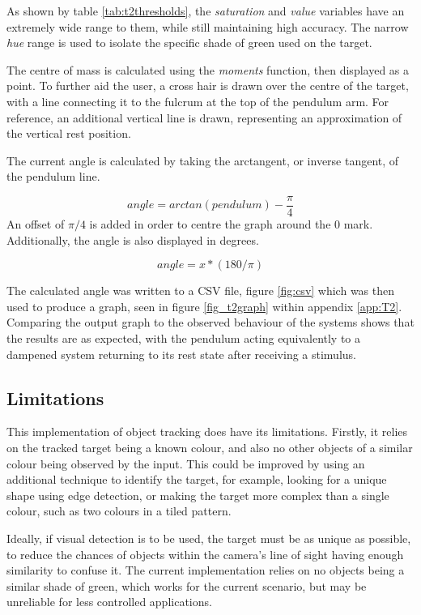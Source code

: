 \documentclass[conference]{IEEEtran}
\begin{document}
As shown by table \ref{tab:t2thresholds}, the \textit{saturation} and \textit{value} variables have an extremely wide range to them, while still maintaining high accuracy. The narrow \textit{hue} range is used to isolate the specific shade of green used on the target.

The centre of mass is calculated using the \textit{moments} function, then displayed as a point. To further aid the user, a cross hair is drawn over the centre of the target, with a line connecting it to the fulcrum at the top of the pendulum arm. For reference, an additional vertical line is drawn, representing an approximation of the vertical rest position.

The current angle is calculated by taking the arctangent, or inverse tangent, of the pendulum line.

\begin{equation}
angle = arctan(pendulum) - \frac{\pi}{4}
\end{equation}
An offset of $\pi /4$ is added in order to centre the graph around the 0 mark. Additionally, the angle is also displayed in degrees.

\begin{equation}
angle = x*(180/\pi )
\end{equation}

The calculated angle was written to a CSV file, figure \ref{fig:csv} which was then used to produce a graph, seen in figure \ref{fig_t2graph} within appendix \ref{app:T2}. Comparing the output graph to the observed behaviour of the systems shows that the results are as expected, with the pendulum acting equivalently to a dampened system returning to its rest state after receiving a stimulus.

\subsection{Limitations}\label{sec:t2_lim}
This implementation of object tracking does have its limitations. Firstly, it relies on the tracked target being a known colour, and also no other objects of a similar colour being observed by the input. This could be improved by using an additional technique to identify the target, for example, looking for a unique shape using edge detection, or making the target more complex than a single colour, such as two colours in a tiled pattern.

Ideally, if visual detection is to be used, the target must be as unique as possible, to reduce the chances of objects within the camera's line of sight having enough similarity to confuse it. The current implementation relies on no objects being a similar shade of green, which works for the current scenario, but may be unreliable for less controlled applications. 
\end{document}
